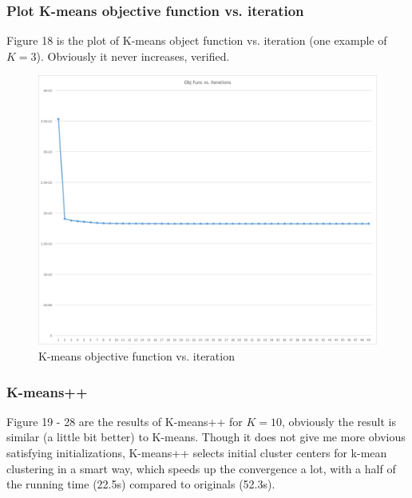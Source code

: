\documentclass[submit]{harvardml}
\begin{document}
\subsubsection*{Plot K-means objective function vs. iteration}

Figure 18 is the plot of K-means object function vs. iteration (one example of $K=3$). Obviously it never increases, verified.

\begin{figure}[ht]
    \centering
    \includegraphics[scale=0.5]{prob3}
    \caption{K-means objective function vs. iteration}
\end{figure}

\subsubsection*{K-means++}

Figure 19 - 28 are the results of K-means++ for $K=10$, obviously the result is similar (a little bit better) to K-means. Though it does not give me more obvious satisfying initializations, K-means++ selects initial cluster centers for k-mean clustering in a smart way, which speeds up the convergence a lot, with a half of the running time (22.5s) compared to originals (52.3s).
\end{document}

